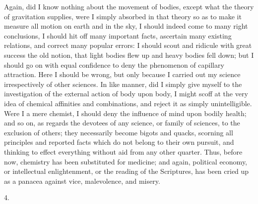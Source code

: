 Again, did I know nothing about the movement of bodies, except
what the theory of gravitation supplies, were I simply absorbed in
that theory so as to make it measure all motion on earth and in the
sky, I should indeed come to many right conclusions, I should hit off
many important facts, ascertain many existing relations, and correct
many popular errors: I should scout and ridicule with great success
the old notion, that light bodies flew up and heavy bodies fell down;
but I should go on with equal confidence to deny the phenomenon of
capillary attraction. Here I should be wrong, but only because I
carried out my science irrespectively of other sciences. In like
manner, did I simply give myself to the investigation of the external
action of body upon body, I might scoff at the very idea of chemical
affinities and combinations, and reject it as simply unintelligible.
Were I a mere chemist, I should deny the influence of mind upon bodily
health; and so on, as regards the devotees of any science, or family
of sciences, to the exclusion of others; they necessarily become
bigots and quacks, scorning all principles and reported facts which do
not belong to their own pursuit, and thinking to effect everything
without aid from any other quarter. Thus, before now, chemistry has
been substituted for medicine; and again, political economy, or
intellectual enlightenment, or the reading of the Scriptures, has been
cried up as a panacea against vice, malevolence, and misery.

4.

